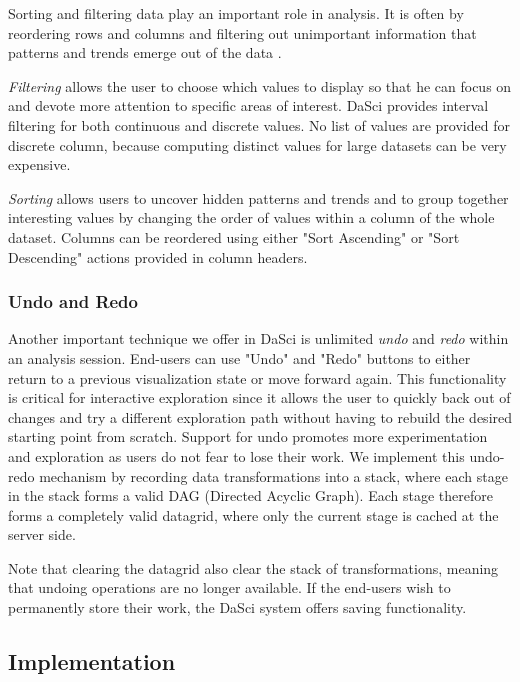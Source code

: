 \documentclass[10pt, a4paper, twocolumn]{article} %
\begin{document}
Sorting and filtering data play an important role in analysis.
It is often by reordering rows and columns and filtering out unimportant information that patterns and trends emerge out of the data .

\textit{Filtering} allows the user to choose which values to display so that he can focus on and devote more attention to specific areas of interest. 
DaSci provides interval filtering for both continuous and discrete values. No list of values are provided for discrete column, because computing distinct values for large datasets can be very expensive.

\textit{Sorting} allows users to uncover hidden patterns and trends and to group together interesting values by changing the order of values within a column of the whole dataset.
Columns can be reordered using either "Sort Ascending" or "Sort Descending" actions provided in column headers.


\subsubsection*{Undo and Redo}

Another important technique we offer in DaSci is unlimited \textit{undo} and \textit{redo} within an analysis session. End-users can use "Undo" and "Redo" buttons to either return to a previous visualization state or move forward again.
This functionality is critical for interactive exploration since it allows the user to quickly back out of changes and try a different exploration path without having to rebuild the desired starting point from scratch.
Support for undo promotes more experimentation and exploration as users do not fear to lose their work.
We implement this undo-redo mechanism by recording data transformations into a stack, where each stage in the stack forms a valid DAG (Directed Acyclic Graph).
Each stage therefore forms a completely valid datagrid, where only the current stage is cached at the server side.

Note that clearing the datagrid also clear the stack of transformations, meaning that undoing operations are no longer available.
If the end-users wish to permanently store their work, the DaSci system offers saving functionality.



\subsection{Implementation}
\end{document}
